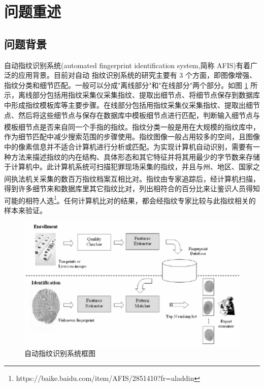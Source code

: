 \documentclass{whutmod}
\newcommand{\upcite}[1]{\textsuperscript{\cite{#1}}}
\begin{document}
	\thispagestyle{empty}
	\tableofcontents
	\setcounter{page}{0}                                               
	\newpage	%
	

	
	\section{问题重述}	
		\subsection{问题背景}
	
自动指纹识别系统(automated fingerprint identification system,简称 AFIS)有着广泛的应用背景。目前对自动 指纹识别系统的研究主要有 3 个方面，即图像增强、指纹分类和细节匹配。一般可以分成"离线部分"和"在线部分"两个部分。如图 \ref{lssct} 所示，离线部分包括用指纹采集仪采集指纹、提取出细节点、将细节点保存到数据库中形成指纹模板库等主要步骤。在线部分包括用指纹采集仪采集指纹、提取出细节点、然后将这些细节点与保存在数据库中模板细节点进行匹配，判断输入细节点与模板细节点是否来自同一个手指的指纹\upcite{1,3}。指纹分类一般是用在大规模的指纹库中，作为细节匹配中减少搜索范围的步骤使用。指纹图像一般占用较多的空间，且图像中的像素信息并不适合计算机进行分析或匹配。为实现计算机自动识别，需要有一种方法来描述指纹的内在结构、具体形态和其它特征并将其用最少的字节数来存储于计算机中。此计算机系统可扫描犯罪现场采集的指纹，并且与州、地区、国家之间执法机关采集的数百万指纹档案互相比对\upcite{2}。指纹由专家追踪后，经计算机扫描，得到许多细节来和数据库里其它指纹比对，列出相符合的百分比来让鉴识人员得知可能的相符人选\footnote{\quad https://baike.baidu.com/item/AFIS/2851410?fr=aladdin}。任何计算机比对的结果，都会经指纹专家比较与此指纹相关的样本来验证。
\begin{figure}[H]
	\centering
	\includegraphics[width=.8\textwidth]{figures/AFIS.png}
	\caption{自动指纹识别系统框图 }\label{lssct}
\end{figure}
\end{document}
